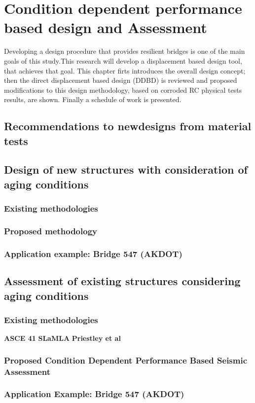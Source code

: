 \chapter{Condition dependent performance based design and Assessment}

\label{chap-five}

Developing a design procedure that provides resilient bridges is one of the main goals of this study.This research will develop a displacement based design tool, that achieves that goal. This chapter firts introduces the overall design concept; then the direct displacement based design (DDBD) is reviewed and proposed modifications to this design methodology, based on corroded RC physical tests results, are shown. Finally a schedule of work is presented.

\section{Recommendations to newdesigns from material tests}
\section{Design of new structures with consideration of aging conditions}
\subsection{Existing methodologies}
\subsection{Proposed methodology}
\subsection{Application example: Bridge 547 (AKDOT)}
\section{Assessment of existing structures considering aging conditions}
\subsection{Existing methodologies}
\textbf{ASCE 41}
\textbf{SLaMLA}
\textbf{Priestley et al}
\subsection{Proposed Condition Dependent Performance Based Seismic Assessment}
\subsection{Application Example: Bridge 547 (AKDOT)}